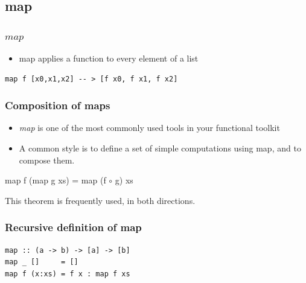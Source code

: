 \documentclass{beamer}
\begin{document}
\subsection{map}
\begin{frame}[fragile]
\frametitle{$map$}

\begin{itemize}
\item map applies a function to every element of a list
\end{itemize}


\begin{verbatim}
map f [x0,x1,x2] -- > [f x0, f x1, f x2]
\end{verbatim}

\end{frame}

\begin{frame}[fragile]
\frametitle{Composition of maps}

\begin{itemize}
\item \emph{map} is one of the most commonly used tools in your functional
  toolkit
\item A common style is to define a set of simple computations
  using map, and to compose them.
\end{itemize}

\begin{theorem}
map f (map g xs) = map (f $\circ$ g) xs
\end{theorem}

This theorem is frequently used, in both directions.

\end{frame}


\begin{frame}[fragile]
\frametitle{Recursive definition of map}

\begin{verbatim}
map :: (a -> b) -> [a] -> [b]
map _ []     = []
map f (x:xs) = f x : map f xs
\end{verbatim}

\end{frame}

\end{document}

